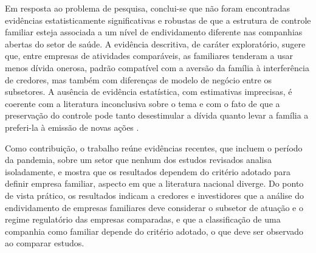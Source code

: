 Em resposta ao problema de pesquisa, conclui-se que não foram encontradas
evidências estatisticamente significativas e robustas de que a estrutura de
controle familiar esteja associada a um nível de endividamento diferente nas
companhias abertas do setor de saúde. A evidência descritiva, de caráter
exploratório, sugere que, entre empresas de atividades comparáveis, as familiares
tenderam a usar menos dívida onerosa, padrão compatível com a aversão da família à
interferência de credores, mas também com diferenças de modelo de negócio entre os
subsetores. A ausência de evidência estatística, com estimativas imprecisas, é
coerente com a literatura inconclusiva sobre o tema e com o fato de que a
preservação do controle pode tanto desestimular a dívida quanto levar a família a
preferi-la à emissão de novas ações \cite{gonzalez2013,poletti2022,kayo2018}.

Como contribuição, o trabalho reúne evidências recentes, que incluem o período da
pandemia, sobre um setor que nenhum dos estudos revisados analisa isoladamente, e
mostra que os resultados dependem do critério adotado para
definir empresa familiar, aspecto em que a literatura nacional diverge. Do ponto de
vista prático, os resultados indicam a credores e investidores que a análise do
endividamento de empresas familiares deve considerar o subsetor de atuação e o
regime regulatório das empresas comparadas, e que a classificação de uma companhia como
familiar depende do critério adotado, o que deve ser observado ao comparar estudos.

